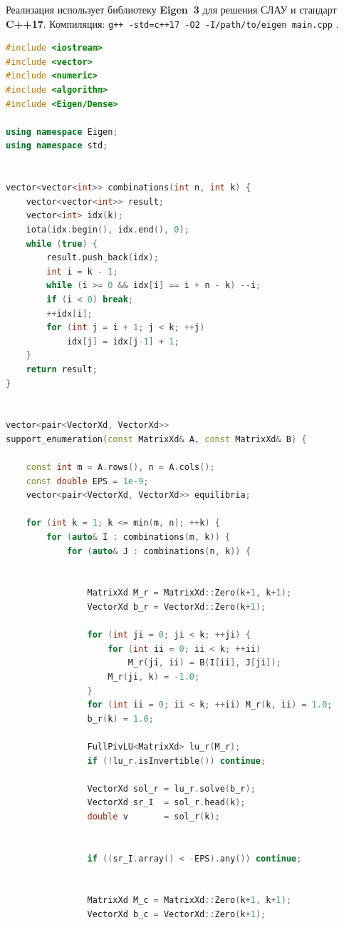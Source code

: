Реализация использует библиотеку \textbf{Eigen~3} для решения СЛАУ
и стандарт \textbf{C++17}.
Компиляция: \texttt{g++ -std=c++17 -O2 -I/path/to/eigen main.cpp} \cite{nashpy_textbook, nisan2007algorithmic}.

\begin{lstlisting}[language=C++,
                   caption={Support Enumeration (C++17 + Eigen~3)},
                   label={lst:support_enum_cpp}]
#include <iostream>
#include <vector>
#include <numeric>      
#include <algorithm>     
#include <Eigen/Dense>

using namespace Eigen;
using namespace std;


vector<vector<int>> combinations(int n, int k) {
    vector<vector<int>> result;
    vector<int> idx(k);
    iota(idx.begin(), idx.end(), 0);
    while (true) {
        result.push_back(idx);
        int i = k - 1;
        while (i >= 0 && idx[i] == i + n - k) --i;
        if (i < 0) break;
        ++idx[i];
        for (int j = i + 1; j < k; ++j)
            idx[j] = idx[j-1] + 1;
    }
    return result;
}


vector<pair<VectorXd, VectorXd>>
support_enumeration(const MatrixXd& A, const MatrixXd& B) {

    const int m = A.rows(), n = A.cols();
    const double EPS = 1e-9;
    vector<pair<VectorXd, VectorXd>> equilibria;

    for (int k = 1; k <= min(m, n); ++k) {
        for (auto& I : combinations(m, k)) {   
            for (auto& J : combinations(n, k)) { 


                MatrixXd M_r = MatrixXd::Zero(k+1, k+1);
                VectorXd b_r = VectorXd::Zero(k+1);

                for (int ji = 0; ji < k; ++ji) {
                    for (int ii = 0; ii < k; ++ii)
                        M_r(ji, ii) = B(I[ii], J[ji]);
                    M_r(ji, k) = -1.0;           
                }
                for (int ii = 0; ii < k; ++ii) M_r(k, ii) = 1.0;
                b_r(k) = 1.0;

                FullPivLU<MatrixXd> lu_r(M_r);
                if (!lu_r.isInvertible()) continue; 

                VectorXd sol_r = lu_r.solve(b_r);
                VectorXd sr_I  = sol_r.head(k);
                double v       = sol_r(k);


                if ((sr_I.array() < -EPS).any()) continue;


                MatrixXd M_c = MatrixXd::Zero(k+1, k+1);
                VectorXd b_c = VectorXd::Zero(k+1);


\end{lstlisting}
